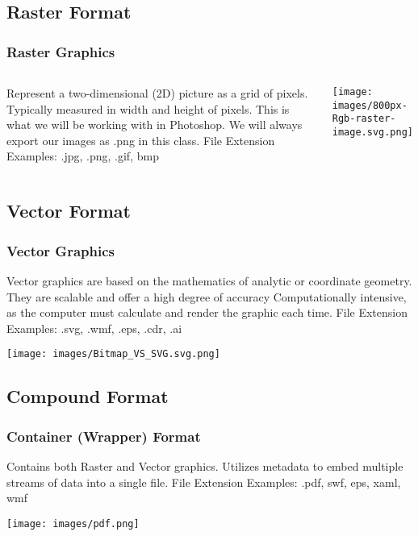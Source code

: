 \documentclass{beamer}
\begin{document}
\subsection{Raster Format}
\begin{frame}
	\frametitle{Raster Graphics}
	\begin{columns}
		\vspace{-25pt}
		\begin{outline}
		\1 Represent a two-dimensional (2D) picture as a grid of pixels.
		\1 Typically measured in width and height of pixels.  
		\1 This is what we will be working with in Photoshop.
		\1 We will always export our images as .png in this class.
		\1 File Extension Examples:  
		\2 .jpg, .png, .gif, bmp
		\end{outline}
		\column{.45\textwidth}
		\texttt{[image: images/800px-Rgb-raster-image.svg.png]}
	\end{columns}
\end{frame}

\subsection{Vector Format}
\begin{frame}
	\frametitle{Vector Graphics}
		\begin{outline}
	\1 Vector graphics are based on the mathematics of analytic or coordinate geometry.  
	\1 They are scalable and offer a high degree of accuracy
	\1 Computationally intensive, as the computer must calculate and render the graphic each time.
	\1 File Extension Examples:  
	\2 .svg, .wmf, .eps, .cdr, .ai
\end{outline}
	\begin{center}
		\texttt{[image: images/Bitmap\_VS\_SVG.svg.png]}
	\end{center}
\end{frame}

\subsection{Compound Format}
\begin{frame}
	\frametitle{Container (Wrapper) Format}
	\begin{outline}
		\1 Contains both Raster and Vector graphics.  
		\1 Utilizes metadata to embed multiple streams of data into a single file.
		\1 File Extension Examples:  
		\2 .pdf, swf, eps, xaml, wmf
	\end{outline}
	\begin{center}
		\texttt{[image: images/pdf.png]}
	\end{center}
\end{frame}
\end{document}
